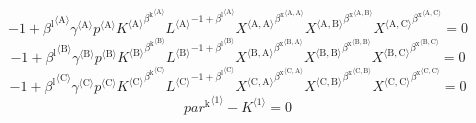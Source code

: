 \begin{equation}
-1 + {{\beta^{\mathrm{l}}}^{\langle \mathrm{\mathrm{A}}\rangle}} {{\gamma}^{\langle \mathrm{\mathrm{A}}\rangle}} {{p}^{\langle \mathrm{A}\rangle}} {{{K}^{\langle \mathrm{A}\rangle}}^{{\beta^{\mathrm{k}}}^{\langle \mathrm{\mathrm{A}}\rangle}}} {{{L}^{\langle \mathrm{A}\rangle}}^{-1 + {\beta^{\mathrm{l}}}^{\langle \mathrm{\mathrm{A}}\rangle}}} {{{X}^{\langle \mathrm{A},\mathrm{A}\rangle}}^{{\beta^{\mathrm{x}}}^{\langle \mathrm{\mathrm{A}},\mathrm{\mathrm{A}}\rangle}}} {{{X}^{\langle \mathrm{A},\mathrm{B}\rangle}}^{{\beta^{\mathrm{x}}}^{\langle \mathrm{\mathrm{A}},\mathrm{\mathrm{B}}\rangle}}} {{{X}^{\langle \mathrm{A},\mathrm{C}\rangle}}^{{\beta^{\mathrm{x}}}^{\langle \mathrm{\mathrm{A}},\mathrm{\mathrm{C}}\rangle}}} = 0
\end{equation}
\begin{equation}
-1 + {{\beta^{\mathrm{l}}}^{\langle \mathrm{\mathrm{B}}\rangle}} {{\gamma}^{\langle \mathrm{\mathrm{B}}\rangle}} {{p}^{\langle \mathrm{B}\rangle}} {{{K}^{\langle \mathrm{B}\rangle}}^{{\beta^{\mathrm{k}}}^{\langle \mathrm{\mathrm{B}}\rangle}}} {{{L}^{\langle \mathrm{B}\rangle}}^{-1 + {\beta^{\mathrm{l}}}^{\langle \mathrm{\mathrm{B}}\rangle}}} {{{X}^{\langle \mathrm{B},\mathrm{A}\rangle}}^{{\beta^{\mathrm{x}}}^{\langle \mathrm{\mathrm{B}},\mathrm{\mathrm{A}}\rangle}}} {{{X}^{\langle \mathrm{B},\mathrm{B}\rangle}}^{{\beta^{\mathrm{x}}}^{\langle \mathrm{\mathrm{B}},\mathrm{\mathrm{B}}\rangle}}} {{{X}^{\langle \mathrm{B},\mathrm{C}\rangle}}^{{\beta^{\mathrm{x}}}^{\langle \mathrm{\mathrm{B}},\mathrm{\mathrm{C}}\rangle}}} = 0
\end{equation}
\begin{equation}
-1 + {{\beta^{\mathrm{l}}}^{\langle \mathrm{\mathrm{C}}\rangle}} {{\gamma}^{\langle \mathrm{\mathrm{C}}\rangle}} {{p}^{\langle \mathrm{C}\rangle}} {{{K}^{\langle \mathrm{C}\rangle}}^{{\beta^{\mathrm{k}}}^{\langle \mathrm{\mathrm{C}}\rangle}}} {{{L}^{\langle \mathrm{C}\rangle}}^{-1 + {\beta^{\mathrm{l}}}^{\langle \mathrm{\mathrm{C}}\rangle}}} {{{X}^{\langle \mathrm{C},\mathrm{A}\rangle}}^{{\beta^{\mathrm{x}}}^{\langle \mathrm{\mathrm{C}},\mathrm{\mathrm{A}}\rangle}}} {{{X}^{\langle \mathrm{C},\mathrm{B}\rangle}}^{{\beta^{\mathrm{x}}}^{\langle \mathrm{\mathrm{C}},\mathrm{\mathrm{B}}\rangle}}} {{{X}^{\langle \mathrm{C},\mathrm{C}\rangle}}^{{\beta^{\mathrm{x}}}^{\langle \mathrm{\mathrm{C}},\mathrm{\mathrm{C}}\rangle}}} = 0
\end{equation}
\begin{equation}
{{p\!a\!r}^{\mathrm{k}}}^{\langle \mathrm{\mathrm{1}}\rangle} - {K}^{\langle \mathrm{1}\rangle} = 0
\end{equation}
